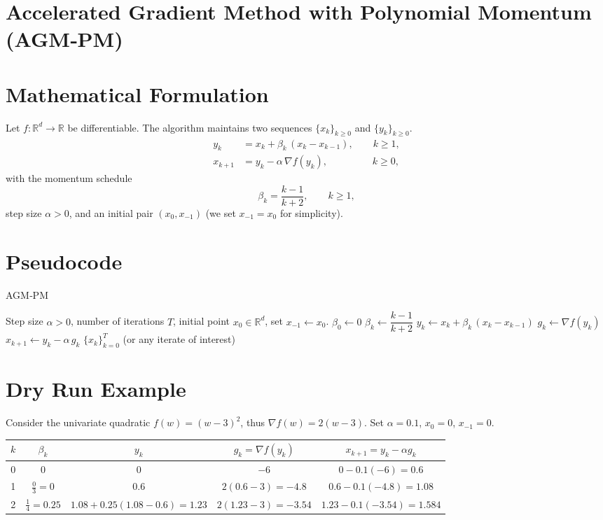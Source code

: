 \documentclass{article}
\newcommand{\grad}{\nabla}
\begin{document}
\section*{Accelerated Gradient Method with Polynomial Momentum (AGM‑PM)}

\section*{Mathematical Formulation}
Let $f:\mathbb{R}^{d}\rightarrow\mathbb{R}$ be differentiable.  
The algorithm maintains two sequences $\{x_k\}_{k\ge 0}$ and $\{y_k\}_{k\ge 0}$.
\[
\boxed{
\begin{aligned}
y_k &= x_k + \beta_k\,(x_k-x_{k-1}), \qquad  k\ge 1,\\[4pt]
x_{k+1} &= y_k - \alpha\,\grad f(y_k), \qquad\qquad\;\; k\ge 0,
\end{aligned}}
\]
with the momentum schedule
\[
\beta_k = \frac{k-1}{k+2},\qquad k\ge 1,
\]
step size $\alpha>0$, and an initial pair $(x_0,x_{-1})$ (we set $x_{-1}=x_0$ for simplicity).

\section*{Pseudocode}
\begin{algorithm}[H]
\caption{AGM‑PM}
\begin{algorithmic}[1]
\Require Step size $\alpha>0$, number of iterations $T$,
        initial point $x_0\in\mathbb{R}^d$,
        set $x_{-1}\gets x_0$.
        \State $\beta_0 \gets 0$ 
    \Else
        \State $\beta_k \gets \dfrac{k-1}{k+2}$ 
    \EndIf
    \State $y_k \gets x_k + \beta_k\,(x_k-x_{k-1})$
    \State $g_k \gets \grad f(y_k)$
    \State $x_{k+1} \gets y_k - \alpha\,g_k$
\EndFor
\State \Return $\{x_k\}_{k=0}^{T}$ (or any iterate of interest)
\end{algorithmic}
\end{algorithm}

\section*{Dry Run Example}
Consider the univariate quadratic $f(w)=(w-3)^2$, thus $\grad f(w)=2(w-3)$.  
Set $\alpha=0.1$, $x_0=0$, $x_{-1}=0$.

\begin{center}
\begin{tabular}{c|c|c|c|c}
$k$ & $\beta_k$ & $y_k$ & $g_k=\grad f(y_k)$ & $x_{k+1}=y_k-\alpha g_k$ \\ \hline
0 & $0$ & $0$ & $-6$ & $0-0.1(-6)=0.6$ \\
1 & $\frac{0}{3}=0$ & $0.6$ & $2(0.6-3)=-4.8$ & $0.6-0.1(-4.8)=1.08$ \\
2 & $\frac{1}{4}=0.25$ & $1.08+0.25(1.08-0.6)=1.23$ & $2(1.23-3)=-3.54$ & $1.23-0.1(-3.54)=1.584$ 
\end{tabular}
\end{center}
\end{document}
